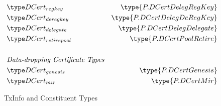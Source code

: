 \begin{figure*}[htb]
\begin{align*}
    & \DCertRegKey & \type{P.DCertDelegRegKey} \\
    & \DCertDeRegKey & \type{P.DCertDelegDeRegKey} \\
    & \DCertDeleg & \type{P.DCertDelegDelegate} \\
    & \DCertRetirePool & \type{P.DCertPoolRetire} \\
    ~\\
    & \emph{Data-dropping Certificate Types} \\
    & \DCertGen & \type{P.DCertGenesis} \\
    & \DCertMir & \type{P.DCertMir} \\
  \end{align*}
  \caption{TxInfo and Constituent Types}
  \label{fig:txinfo-types}
\end{figure*}

